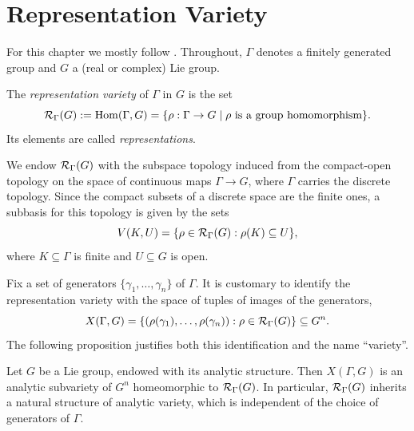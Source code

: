 \section{Representation Variety}

For this chapter we mostly follow \cite{maret_note_nodate, casimiroCharacterVarietiesTheir2026}. Throughout, $\Gamma$ denotes a finitely generated group and $G$ a (real or complex) Lie group.

\begin{definition}
    The \emph{representation variety} of $\Gamma$ in $G$ is the set
    \[
       \RepVar{\Gamma}{G} := \Hom(\Gamma, G) = \{ \rho : \Gamma \to G \mid \rho \text{ is a group homomorphism} \}.
    \]
    Its elements are called \emph{representations}.
\end{definition}

We endow $\RepVar{\Gamma}{G}$ with the subspace topology induced from the compact-open topology on the space of continuous maps $\Gamma \to G$, where $\Gamma$ carries the discrete topology. Since the compact subsets of a discrete space are the finite ones, a subbasis for this topology is given by the sets
\[
    V(K, U) = \{ \rho \in \RepVar{\Gamma}{G} : \rho(K) \subseteq U \},
\]
where $K \subseteq \Gamma$ is finite and $U \subseteq G$ is open.

Fix a set of generators $\{\gamma_1, \dots, \gamma_n\}$ of $\Gamma$. It is customary to identify the representation variety with the space of tuples of images of the generators,
\[
    X(\Gamma, G) = \{ (\rho(\gamma_1), \dots, \rho(\gamma_n)) : \rho \in \RepVar{\Gamma}{G} \} \subseteq G^n.
\]
The following proposition justifies both this identification and the name ``variety''.

\begin{proposition}\label{prop:analytic-structure}
    Let $G$ be a Lie group, endowed with its analytic structure. Then $X(\Gamma, G)$ is an analytic subvariety of $G^n$ homeomorphic to $\RepVar{\Gamma}{G}$. In particular, $\RepVar{\Gamma}{G}$ inherits a natural structure of analytic variety, which is independent of the choice of generators of $\Gamma$.
\end{proposition}

